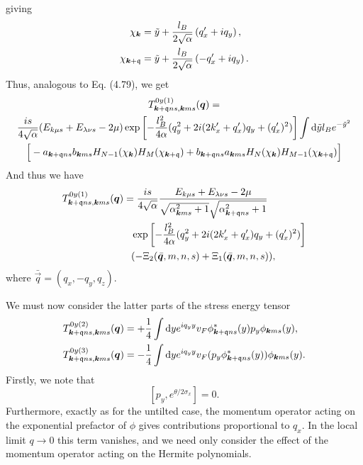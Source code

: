 giving
\begin{align}
  \chi _{\bm{k}} &= \tilde{y} + \frac{l_{B}}{2 \sqrt{\alpha }} \left( q'_x + i q_{y}\right),\\
  \chi _{\bm{k} + \mathfrak{q}} &= \tilde{y} + \frac{l_{B}}{2 \sqrt{\alpha }} \left( -q' _{x} + i q_{y}\right).
\end{align}
Thus, analogous to Eq. (4.79), we get
\begin{multline}
  \label{eq:50}
  T_{\bm{k} + \mathfrak{q} n s, \bm{k} m s}^{0y (1)} (\bm{q}) =\\
  \frac{is}{4 \sqrt{\alpha} }
  (E_{k\mu s} + E_{\lambda  \nu  s} - 2 \mu)
  \exp \left[
    -\frac{l_{B}^2}{4 \alpha } (q_{y}^2 + 2i (2 k' _x + q' _x) q_{y} + (q' _x)^2 )
  \right  ]
  \int \mathrm{d} \tilde{y} l_{B} e^{-\tilde{y}^2}\\
 \Big[
  - a_{\bm{k} + \mathfrak{q} ns} b_{\bm{k} m s}
  H_{N-1} ( \chi _{\bm{k}} )
  H_{M} ( \chi _{\bm{k} + \mathfrak{q}} )
  + b_{\bm{k} + \mathfrak{q} ns } a_{\bm{k} m s}
  H_{N}( \chi _{\bm{k}} )
  H_{M-1} ( \chi _{\bm{k} + \mathfrak{q}} )
  \Big]
\end{multline}
And thus we have
\begin{align}
  T_{\vec{k} + \qvec{q} n s, \vec{k} m s}^{0y (1)} (\vec{q}) &=
  \frac{is}{4 \sqrt{\alpha} }
  \frac{E_{k\mu s} + E_{\lambda  \nu  s} - 2 \mu}{
    \sqrt{\alpha _{\vec{k} m s}^2 + 1}
    \sqrt{\alpha _{\vec{k} + \qvec{q} n s}^2 + 1}
  }\\
  &\pe \exp \left[
    -\frac{l_{B}^2}{4 \alpha } (q_{y}^2 + 2i ( 2k' _x + q' _x ) q_{y} + (q' _x)^2)
  \right  ]\\
  &\pe (-\Xi_{2} (\bar{\vec{q}}, m, n, s) + \Xi_{1}(\bar{\vec{q}}, m, n, s)),
\end{align}
where \(\bar{\vec{q}} = (q_{x}, -q_{y}, q_{z})\).

We must now consider the latter parts of the stress energy tensor
\begin{align}
  T_{\bm{k} + \mathfrak{q} ns, \bm{k} ms}^{0y (2)} (\bm{q}) &=
                                                             + \frac{1}{4} \int \mathrm{d} y
                                                             e^{iq_{y} y} v_{F}
                                                             \phi ^{*}_{\bm{k}+\mathfrak{q} ns} (y) p_{y} \phi _{\bm{k} m s} (y),\\
  T_{\bm{k} + \mathfrak{q} ns, \bm{k} ms}^{0y (3)} (\bm{q}) &=
                                                             - \frac{1}{4} \int \mathrm{d} y
                                                             e^{iq_{y} y} v_{F}
                                                             (p_{y} \phi ^{*}_{\bm{k}+\mathfrak{q} ns} (y))  \phi _{\bm{k} m s} (y).
\end{align}
Firstly, we note that
\[
  [p_{y} , e^{\theta /2 \sigma _{x}}] = 0.
\]
Furthermore, exactly as for the untilted case, the momentum operator acting on the exponential prefactor of \(\phi \) gives contributions proportional to \(q_{x}\).
In the local limit \(q\to  0\) this term vanishes, and we need only consider the effect of the momentum operator acting on the Hermite polynomials.

